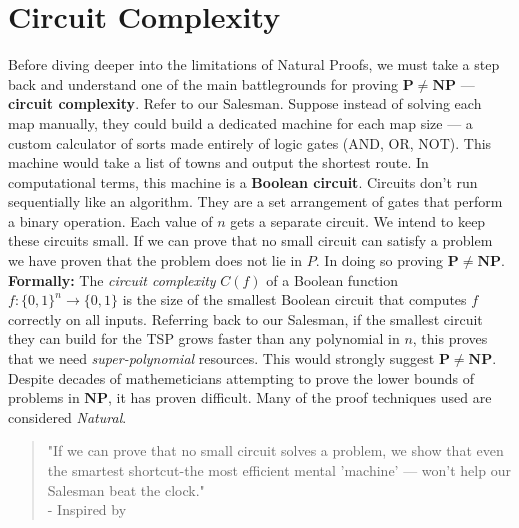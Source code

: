 \documentclass[12pt]{report}
\begin{document}
\section{Circuit Complexity}
Before diving deeper into the limitations of Natural Proofs, we must take a step back and understand one of the main battlegrounds for proving $\mathbf{P \ne NP}$ --- \textbf{circuit complexity}.
Refer to our Salesman.
Suppose instead of solving each map manually, they could build a dedicated machine for each map size --- a custom calculator of sorts made entirely of logic gates (AND, OR, NOT).
This machine would take a list of towns and output the shortest route.
In computational terms, this machine is a \textbf{Boolean circuit}.
Circuits don't run sequentially like an algorithm.
They are a set arrangement of gates that perform a binary operation.
Each value of $n$ gets a separate circuit.
We intend to keep these circuits small.
If we can prove that no small circuit can satisfy a problem we have proven that the problem does not lie in $P$.
In doing so proving $\mathbf{P \ne NP}$.
\vspace{0.2cm}
\textbf{Formally:}
The \textit{circuit complexity} $C(f)$ of a Boolean function $f : \{0,1\}^n \rightarrow \{0,1\}$ is the size of the smallest Boolean circuit that computes $f$ correctly on all inputs.
\vspace{0.1cm}
Referring back to our Salesman, if the smallest circuit they can build for the TSP grows faster than any polynomial in $n$, this proves that we need \textit{super-polynomial} resources.
This would strongly suggest $\mathbf{P \ne NP}$.
\vspace{0.2cm}
Despite decades of mathemeticians attempting to prove the lower bounds of problems in $\mathbf{NP}$, it has proven difficult.
Many of the proof techniques used are considered \textit{Natural}.
\begin{quote}
    "If we can prove that no small circuit solves a problem, we show that even the smartest shortcut-the most efficient mental 'machine' --- won't help our Salesman beat the clock."\\
    - Inspired by \cite{fortnow2009status}
\end{quote}
\end{document}
